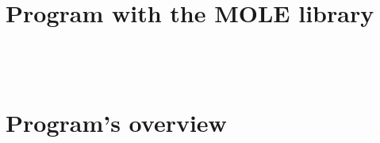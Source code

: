 \documentclass[
	8pt,
	professionalfonts,
	leqno,
	intlimits,
	c,
    aspectratio=1610,
]{beamer}
\begin{document}
\section{Program with the MOLE library}

\begin{frame}
    \frametitle{\secname}
    \begin{listing}[H]
        \tiny
        \centering
        \inputminted[frame=single,framesep=10pt,linenos,firstline=1,lastline=37,highlightlines={17,18}]{octave}{../examples/octave/hyperbolic1D.m}
    \end{listing}
\end{frame}

\begin{frame}
    \frametitle{\secname}
    \begin{listing}[H]
        \tiny
        \centering
        \inputminted[frame=single,framesep=10pt,linenos,firstline=41,lastline=57,highlightlines={52-54}]{octave}{../examples/octave/hyperbolic1D.m}
    \end{listing}
\end{frame}

\begin{frame}
    \begin{listing}[H]
        \tiny
        \centering
        \inputminted[frame=single,framesep=10pt,linenos,firstline=1,lastline=59,highlightlines={27-29}]{cpp}{../examples/cpp/transport1D.cpp}
    \end{listing}
\end{frame}

\section{Program's overview}
\end{document}
